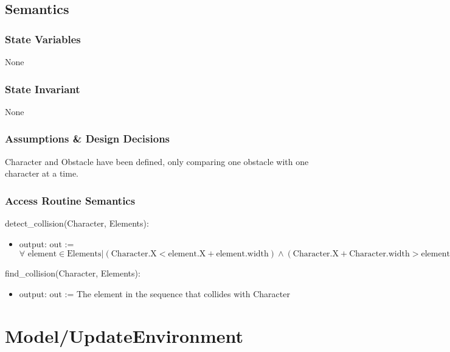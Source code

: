 \documentclass[12pt]{article}
\begin{document}
\subsection* {Semantics}

\subsubsection* {State Variables}

None

\subsubsection* {State Invariant}

None

\subsubsection* {Assumptions \& Design Decisions}

Character and Obstacle have been defined, only comparing one obstacle with one character at a time.

\subsubsection* {Access Routine Semantics}

detect\_collision(Character, Elements):
\begin{itemize}
    \item output: out := $\forall \text{ element} \in \text{Elements} | (\text{Character.X}< \text{element.X} + \text{element.width}) \land (\text{Character.X} + \text{Character.width} > \text{element.X}) \land (\text{Character.Y} < \text{element.Y} + \text{element.height}) \land (\text{Character.Y} + \text{Character.height} > \text{element.Y})$
\end{itemize}

find\_collision(Character, Elements):
\begin{itemize}
    \item output: out := The element in the sequence that collides with Character
\end{itemize}


\newpage
\section*{Model/UpdateEnvironment}
\end{document}
